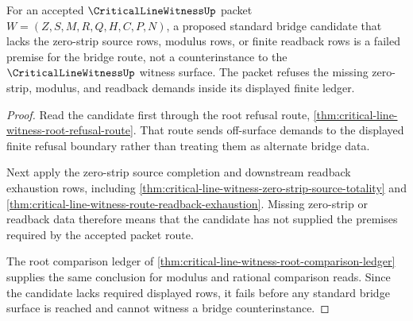\begin{theorem}
\label{thm:critical-line-witness-stdbridge-candidate-refusal}
For an accepted $\CriticalLineWitnessUp$ packet $W=(Z,S,M,R,Q,H,C,P,N)$, a proposed standard bridge candidate that lacks the zero-strip source rows, modulus rows, or finite readback rows is a failed premise for the bridge route, not a counterinstance to the $\CriticalLineWitnessUp$ witness surface. The packet refuses the missing zero-strip, modulus, and readback demands inside its displayed finite ledger.
\end{theorem}
\begin{proof}
Read the candidate first through the root refusal route, \autoref{thm:critical-line-witness-root-refusal-route}. That route sends off-surface demands to the displayed finite refusal boundary rather than treating them as alternate bridge data.

Next apply the zero-strip source completion and downstream readback exhaustion rows, including \autoref{thm:critical-line-witness-zero-strip-source-totality} and \autoref{thm:critical-line-witness-route-readback-exhaustion}. Missing zero-strip or readback data therefore means that the candidate has not supplied the premises required by the accepted packet route.

The root comparison ledger of \autoref{thm:critical-line-witness-root-comparison-ledger} supplies the same conclusion for modulus and rational comparison reads. Since the candidate lacks required displayed rows, it fails before any standard bridge surface is reached and cannot witness a bridge counterinstance.
\end{proof}

